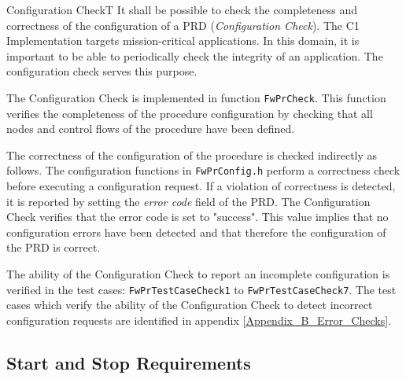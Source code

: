 \documentclass[a4paper,10pt]{article}
\newenvironment{fw_req}[6]
{\addtocounter{subsubsection}{1}
	\hspace{0.2cm}\textbf{FW-\arabic{section}.\arabic{subsection}.\arabic{subsubsection}/#2
	\hspace{0.8cm} #1}
	\vspace{-10pt}
\begin{longtable}{p{2.7cm}P{8.5cm}}
\hline
\textsc{Requirement} & #3 \\
\textsc{Justification} & #4 \\
\textsc{Implementation} & #5  \\ 
\textsc{Verification} & #6  \\
\hline
}
{\end{longtable}}
\begin{document}
\begin{fw_req}{Configuration Check}{T}
{It shall be possible to check the completeness and correctness of the 
configuration of a PRD (\emph{Configuration Check}).}
{The C1 Implementation targets mission-critical applications. 
In this domain, it is important to be able to periodically 
check the integrity of an application. 
The configuration check serves this purpose.}
{The Configuration Check is implemented in function \texttt{FwPrCheck}. 
This function verifies the completeness of the procedure configuration by checking that all nodes 
and control flows of the procedure have been defined. 

The correctness of the configuration of the procedure is checked indirectly as follows. 
The configuration functions in  \texttt{FwPrConfig.h} perform a correctness check before
executing a configuration request. 
If a violation of correctness is detected, it is reported by setting the \emph{error code} 
field of the PRD. 
The Configuration Check verifies that the error code is set to "success". 
This value implies that no configuration errors have been detected and that therefore the 
configuration of the PRD is correct.} 
{The ability of the Configuration Check to report an incomplete 
configuration is verified in the test cases: \texttt{FwPrTestCaseCheck1} 
to \texttt{FwPrTestCaseCheck7}. 
The test cases which verify the ability of the Configuration Check to detect incorrect 
configuration requests are identified in appendix \ref{Appendix_B_Error_Checks}.}
\end{fw_req}

\subsection{Start and Stop Requirements}\label{req:startStopInterfacePRD}
\end{document}
